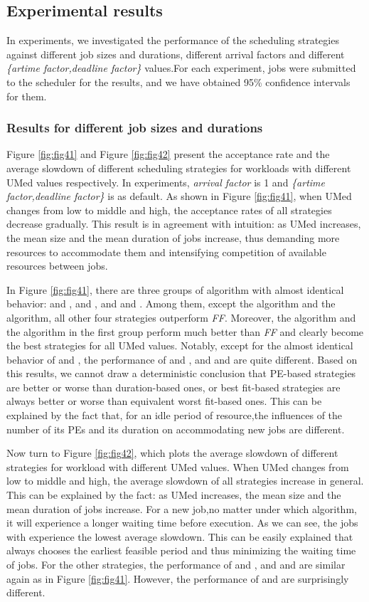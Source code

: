 \documentclass[preprint,12pt]{elsarticle}
\begin{document}
\subsection{Experimental results}
\label{results}
In experiments, we investigated the performance of the scheduling strategies against different job sizes and durations, different arrival factors and different \emph{\{artime factor,deadline factor\}} values.For each experiment,  jobs were submitted to the scheduler for the results, and we have obtained 95\% confidence intervals for them.

\subsubsection{Results for different job sizes and durations}

Figure \ref{fig:fig41} and Figure \ref{fig:fig42} present the acceptance rate and the average slowdown of different scheduling strategies for workloads with different UMed values respectively. In experiments, \emph{arrival factor} is 1 and  \emph{\{artime factor,deadline factor\}} is  as default. As shown in Figure \ref{fig:fig41}, when UMed changes from low to middle and high, the acceptance rates of all strategies decrease gradually. This result is in agreement with intuition: as UMed increases, the mean size and the mean duration of jobs increase, thus demanding more resources to accommodate them and intensifying competition of available resources between jobs.

In Figure \ref{fig:fig41}, there are three groups of algorithm with almost identical behavior:  and ,  and , and  and . Among them, except the  algorithm and the  algorithm, all other four strategies outperform \emph{FF}. Moreover, the  algorithm and the  algorithm in the first group perform much better than \emph{FF} and clearly become the best strategies for all UMed values. Notably, except for the almost identical behavior of  and , the performance of  and , and  and  are quite different. Based on this results, we cannot draw a deterministic conclusion that PE-based strategies are better or worse than duration-based ones, or best fit-based strategies are always better or worse than equivalent worst fit-based ones. This can be explained by the fact that, for an idle period of resource,the influences of the number of its PEs and its duration on accommodating new jobs are different.

Now turn to Figure \ref{fig:fig42}, which plots the average slowdown of different strategies for workload with different UMed values. When UMed changes from low to middle and high, the average slowdown of all strategies  increase in general. This can be explained by the fact: as UMed increases, the mean size and the mean duration of jobs increase. For a new job,no matter under which algorithm, it will experience a longer waiting time before execution. As we can see, the jobs with  experience the lowest average slowdown. This can be easily explained that  always chooses the earliest feasible period and thus minimizing the waiting time of jobs. For the other strategies, the performance of  and , and  and  are similar again as in Figure \ref{fig:fig41}. However, the performance of  and  are surprisingly different.
\end{document}
